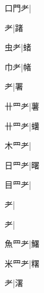 \begin{multicols}{2}
{{\cjk{}口門耂}\mktsJzrVerticalBar{}{\cjk{}{\cnsym{}　}{\cnsym{}　}{\cnsym{}　}}|{}\par
{耂}\mktsJzrVerticalBar{}{\cjk{}{\cnsym{}　}{\cnsym{}　}{\cnsym{}　}}|{\cjk{}踷}\par
{\cjk{}{\cnsym{}　}虫耂}\mktsJzrVerticalBar{}{\cjk{}{\cnsym{}　}{\cnsym{}　}{\cnsym{}　}}|{\cjk{}蝫}\par
{\cjk{}{\cnsym{}　}巾耂}\mktsJzrVerticalBar{}{\cjk{}{\cnsym{}　}{\cnsym{}　}{\cnsym{}　}}|{\cjk{}帾}\par
{耂}\mktsJzrVerticalBar{}{\cjk{}{\cnsym{}　}{\cnsym{}　}{\cnsym{}　}}|{\cjk{}署}\par
{\cjk{}卄{\cnxHanaA{}罒}耂}\mktsJzrVerticalBar{}{\cjk{}{\cnsym{}　}{\cnsym{}　}{\cnsym{}　}}|{\cjk{}薯}\par
{\cjk{}卄{\cnxHanaA{}罒}耂}|{\cjk{}蠴}\par
{\cjk{}木{\cnxHanaA{}罒}耂}\mktsJzrVerticalBar{}{\cjk{}{\cnsym{}　}{\cnsym{}　}{\cnsym{}　}}|{}\par
{\cjk{}日{\cnxHanaA{}罒}耂}\mktsJzrVerticalBar{}{\cjk{}{\cnsym{}　}{\cnsym{}　}{\cnsym{}　}}|{\cjk{}曙}\par
{\cjk{}目{\cnxHanaA{}罒}耂}\mktsJzrVerticalBar{}{\cjk{}{\cnsym{}　}{\cnsym{}　}{\cnsym{}　}}|{}\par
{耂}\mktsJzrVerticalBar{}{\cjk{}{\cnsym{}　}{\cnsym{}　}{\cnsym{}　}}|{}\par
{耂}\mktsJzrVerticalBar{}{\cjk{}{\cnsym{}　}{\cnsym{}　}{\cnsym{}　}}|{}\par
{\cjk{}魚{\cnxHanaA{}罒}耂}\mktsJzrVerticalBar{}{\cjk{}{\cnsym{}　}{\cnsym{}　}{\cnsym{}　}}|{\cjk{}鱰}\par
{\cjk{}米{\cnxHanaA{}罒}耂}\mktsJzrVerticalBar{}{\cjk{}{\cnsym{}　}{\cnsym{}　}{\cnsym{}　}}|{\cjk{}糬}\par
{耂}\mktsJzrVerticalBar{}{\cjk{}{\cnsym{}　}{\cnsym{}　}{\cnsym{}　}}|{\cjk{}濖}\par
}
\end{multicols}
